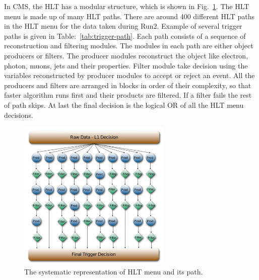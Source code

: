 In CMS, the HLT has a modular structure, which is shown in Fig.~\ref{fig:HLT_menue_workflow}. The HLT menu is made up of many HLT paths. There are around 400 different HLT paths in the HLT menu for the data taken during Run2. Example of several trigger paths is given in Table:~\ref{tab:trigger-path}. Each path consists of a sequence of reconstruction and filtering modules.  The modules in each path are either object producers or filters. The producer modules reconstruct the object like electron, photon,  muons, jets and their properties. Filter module take decision using the variables reconstructed by producer modules to accept or reject an event. All the producers and filters are arranged in blocks in order of their complexity, so that faster algorithm runs first and their products are filtered. If a filter fails the rest of path skips. At last the final decision is the logical OR of all the HLT menu decisions.
\begin{figure}[htbp]
	\centering
	\includegraphics[width=0.65\textwidth]{figures/LHC/HLT_menu_workflow.png}
	\caption{The systematic representation of HLT menu and its path\cite{Perrotta2015}.}
	\label{fig:HLT_menue_workflow}
\end{figure}

